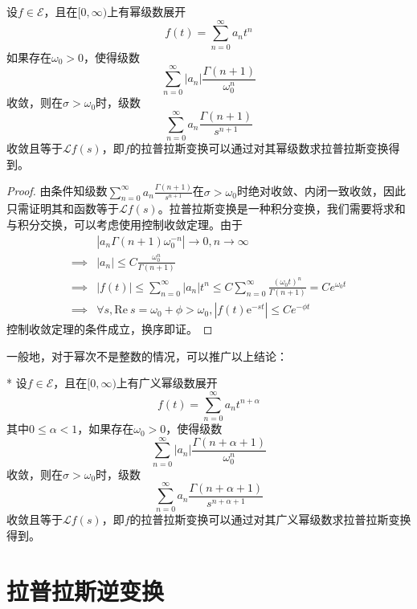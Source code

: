 \documentclass{ctexbook}
\begin{document}
\begin{theorem}[拉普拉斯变换的级数求法]
    设$f\in\mathcal{E} $，且在$[0,\infty)$上有幂级数展开
    \[f(t)=\sum_{n=0}^{\infty}a_n t^n\]
    如果存在$\omega_0>0$，使得级数
    \[\sum_{n=0}^{\infty}|a_n|\frac{\Gamma(n+1)}{\omega_0^{n}}\]
    收敛，则在$\sigma>\omega_0$时，级数
    \[\sum_{n=0}^{\infty}a_n \frac{\Gamma(n+1)}{s^{n+1}}\]
    收敛且等于$\mathcal{L} f(s)$，即$f$的拉普拉斯变换可以通过对其幂级数求拉普拉斯变换得到。
\end{theorem}
\begin{proof}
    由条件知级数$\sum_{n=0}^{\infty}a_n \frac{\Gamma(n+1)}{s^{n+1}}$在$\sigma>\omega_0$时绝对收敛、内闭一致收敛，因此只需证明其和函数等于$\mathcal{L} f(s)$。拉普拉斯变换是一种积分变换，我们需要将求和与积分交换，可以考虑使用控制收敛定理。由于
    \begin{align*}
        &|a_n \Gamma(n+1)\omega_0^{-n}|\to 0, n\to\infty\\
        \implies &|a_n|\leq C\frac{\omega_0^{n}}{\Gamma(n+1)}\\
        \implies &|f(t)|\leq \sum_{n=0}^{\infty}|a_n|t^n\leq C\sum_{n=0}^{\infty}\frac{(\omega_0 t)^{n}}{\Gamma(n+1)}=Ce^{\omega_0 t}\\
        \implies &\forall s,\text{Re}\ s=\omega_0+\phi>\omega_0,|f(t)\mathrm{e}^{-s t}|\leq Ce^{-\phi t}
    \end{align*}
    控制收敛定理的条件成立，换序即证。
\end{proof}

一般地，对于幂次不是整数的情况，可以推广以上结论：
\begin{corollary}*
   设$f\in\mathcal{E} $，且在$[0,\infty)$上有广义幂级数展开
   \[f(t)=\sum_{n=0}^{\infty}a_n t^{n+\alpha}\]
   其中$0\leq\alpha<1$，如果存在$\omega_0>0$，使得级数
   \[\sum_{n=0}^{\infty}|a_n|\frac{\Gamma(n+\alpha+1)}{\omega_0^{n}}\]
   收敛，则在$\sigma>\omega_0$时，级数
   \[\sum_{n=0}^{\infty}a_n \frac{\Gamma(n+\alpha+1)}{s^{n+\alpha+1}}\]
   收敛且等于$\mathcal{L} f(s)$，即$f$的拉普拉斯变换可以通过对其广义幂级数求拉普拉斯变换得到。
\end{corollary}

\section{拉普拉斯逆变换}\label{sec:Laplace_Inverse}
\end{document}

